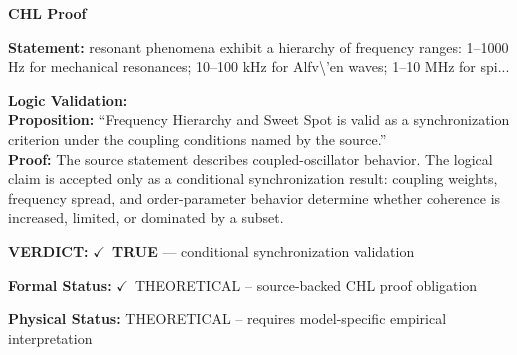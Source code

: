 \vspace{0.45em}
\noindent\textbf{CHL Proof}\par
\textbf{Statement:} resonant phenomena exhibit a hierarchy of frequency ranges: 1--1000 Hz for mechanical
resonances; 10--100 kHz for Alfv\textbackslash{}'en waves; 1--10 MHz for spi...

\textbf{Logic Validation:}\\
\textbf{Proposition:} ``Frequency Hierarchy and Sweet Spot is valid as a synchronization criterion under the
coupling conditions named by the source.''\\
\textbf{Proof:} The source statement describes coupled-oscillator behavior. The logical claim is
accepted only as a conditional synchronization result: coupling weights, frequency
spread, and order-parameter behavior determine whether coherence is increased, limited,
or dominated by a subset.

\textbf{VERDICT:} \ensuremath{\checkmark}\ \textbf{TRUE} --- conditional synchronization validation

\textbf{Formal Status:} \ensuremath{\checkmark}\ THEORETICAL -- source-backed CHL proof obligation

\textbf{Physical Status:} THEORETICAL -- requires model-specific empirical interpretation
\par\vspace{0.45em}
\par
\ifTZPDarkEdition
{}
\fi
\endgroup
\endgroup
